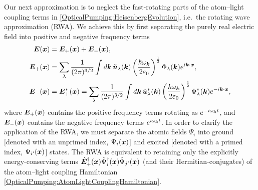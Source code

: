 Our next approximation is to neglect the fast-rotating parts of the atom--light coupling terms in \eqref{OpticalPumping:HeisenbergEvolution}, i.e.\  the rotating wave approximation (RWA).  We achieve this by first separating the purely real electric field into positive and negative frequency terms
\begin{align}
    \bm{E}(\bm{x}) &= \bm{E}_+(\bm{x}) + \bm{E}_-(\bm{x}), \\
    \bm{E}_+(\bm{x}) &= \sum_\lambda \frac{1}{(2\pi)^{3/2}} \int d \bm{k}\, \check{\bm{u}}_\lambda(\bm{k}) \left(\frac{\hbar \omega_{\bm{k}}}{2 \varepsilon_0}\right)^{\frac{1}{2}} \Phi_\lambda(\bm{k}) e^{i \bm{k} \cdot \bm{x}},\\
    \bm{E}^{\phantom{*}}_-(\bm{x}) &= \bm{E}_+^*(\bm{x}) = \sum_\lambda \frac{1}{(2\pi)^{3/2}} \int d \bm{k}\, \check{\bm{u}}^*_\lambda(\bm{k}) \left(\frac{\hbar \omega_{\bm{k}}}{2 \varepsilon_0}\right)^{\frac{1}{2}} \Phi^*_\lambda(\bm{k}) e^{-i \bm{k} \cdot \bm{x}},
\end{align}
where $\bm{E}_+(\bm{x})$ contains the positive frequency terms rotating as $e^{-i \omega_{\bm{k}} t}$, and $\bm{E}_-(\bm{x})$ contains the negative frequency terms $e^{i \omega_{\bm{k}} t}$.  In order to clarify the application of the RWA, we must separate the atomic fields $\Psi_i$ into ground [denoted with an unprimed index, $\Psi_i(\bm{x})$] and excited [denoted with a primed index, $\Psi_{i'}(\bm{x})$] states.  The RWA is equivalent to retaining only the explicitly energy-conserving terms $\hat{\bm{E}}_+^\dagger(\bm{x})\hat{\Psi}_i^\dagger(\bm{x}) \hat{\Psi}_{j'}(\bm{x})$ (and their Hermitian-conjugates) of the atom--light coupling Hamiltonian \eqref{OpticalPumping:AtomLightCouplingHamiltonian}.  

